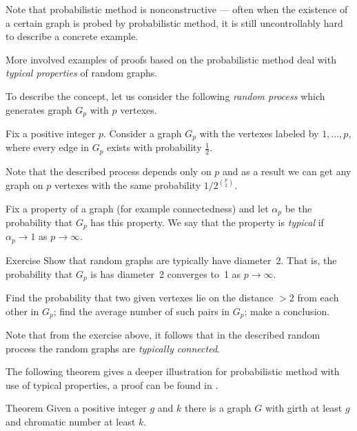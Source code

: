 Note that probabilistic method is nonconstructive ---
often when the existence of a certain graph is probed by probabilistic method,
it is still uncontrollably hard to describe a concrete example.

More involved examples of proofs based on the probabilistic method deal with {}\emph{typical properties} of random graphs.

To describe the concept, let us consider the following {}\emph{random process} which generates graph $G_p$ with $p$ vertexes.

Fix a positive integer $p$. 
Consider a graph $G_p$ with the vertexes labeled by $1,\dots,p$,
where every edge in $G_p$ exists with probability $\tfrac12$.

Note that the described process depends only on $p$ and as a result we can get any graph on $p$ vertexes with the same probability $1/2^{\binom{p}{2}}$.

Fix a property of a graph (for example connectedness)
and let $\alpha_p$ be the probability that $G_p$ has this property.
We say that the property is \emph{typical} if $\alpha_p\to 1$ as $p\to \infty$.

\begin{thm}{Exercise}
Show that random graphs are typically have diameter~2.
That is, the probability that $G_p$ is has diameter~2 converges to~1 as $p\to \infty$.
\end{thm}

 Find the probability that two given vertexes lie on the distance $>2$ from each other in $G_p$; find the average number of such pairs in $G_p$; make a conclusion.

\medskip

Note that from the exercise above, it follows that in the described random process the random graphs are {}\emph{typically connected}.

The following theorem gives a deeper illustration for probabilistic method with use of typical properties,
a proof can be found in \cite[Chapter 44]{aigner-ziegler}.

\begin{thm}{Theorem}
Given a positive integer $g$ and $k$ there is a graph $G$ with girth at least $g$ and chromatic number at least $k$.
\end{thm}
